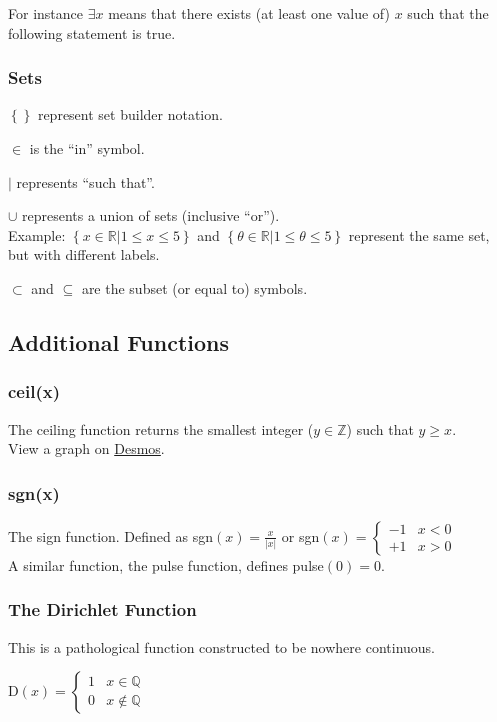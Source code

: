 \documentclass{article}
\begin{document}
For instance $\exists x$ means that there exists (at least one value of) $x$ such that the following statement is true.

\subsubsection{Sets}
$\left\{\right\}$ represent set builder notation.

$\in$ is the ``in'' symbol.

$|$ represents ``such that''.

$\cup$ represents a union of sets (inclusive ``or'').\\
Example: $\left\{x \in \mathbb{R} | 1 \le x \le 5 \right\}$ and $\left\{\theta \in \mathbb{R} | 1 \le \theta \le 5 \right\}$ represent the same set, but with different labels.

$\subset$ and $\subseteq$ are the subset (or equal to) symbols.

\subsection{Additional Functions}
\subsubsection{ceil(x)}
The ceiling function returns the smallest integer ($y\in\mathbb{Z}$) such that $y \ge x$.\\
View a graph on \href{https://www.desmos.com/calculator/cpay9r9g5w}{Desmos}.

\subsubsection{sgn(x)}
The sign function. Defined as
sgn$(x) = \frac{x}{|x|}$ or sgn$(x) = \begin{cases}
    -1 &x<0\\
    +1 &x>0
\end{cases}$\\
A similar function, the pulse function, defines pulse$(0)=0$.

\subsubsection{The Dirichlet Function}
This is a pathological function constructed to be nowhere continuous.

D$(x) = \begin{cases}
    1 & x\in\mathbb{Q}\\
    0 & x\notin\mathbb{Q}
\end{cases}$
\end{document}
